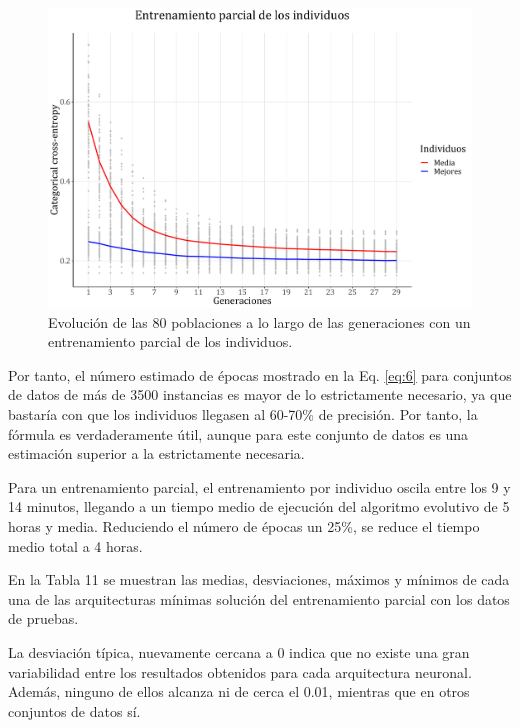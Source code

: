 \documentclass[spanish,a4paper,12pt,twoside]{report}
\begin{document}
  \begin{figure}[H]
    \centering
    \includegraphics[width = 1\textwidth]{resources/Fig24.pdf}
    \caption{Evolución de las 80 poblaciones a lo largo de las generaciones con un entrenamiento parcial de los individuos.}
    \label{fig:24}
  \end{figure} \par
  Por tanto, el número estimado de épocas mostrado en la Eq. \ref{eq:6} para conjuntos de datos de más de 3500 instancias es mayor de lo estrictamente necesario, ya que bastaría con que los individuos llegasen al 60-70\% de precisión. Por tanto, la fórmula es verdaderamente útil, aunque para este conjunto de datos es una estimación superior a la estrictamente necesaria. \par
  Para un entrenamiento parcial, el entrenamiento por individuo oscila entre los 9 y 14 minutos, llegando a un tiempo medio de ejecución del algoritmo evolutivo de 5 horas y media. Reduciendo el número de épocas un 25\%, se reduce el tiempo medio total a 4 horas. \par
  En la Tabla 11 se muestran las medias, desviaciones, máximos y mínimos de cada una de las arquitecturas mínimas solución del entrenamiento parcial con los datos de pruebas. \par
  La desviación típica, nuevamente cercana a 0 indica que no existe una gran variabilidad entre los resultados obtenidos para cada arquitectura neuronal. Además, ninguno de ellos alcanza ni de cerca el 0.01, mientras que en otros conjuntos de datos sí. \vfill
\end{document}
